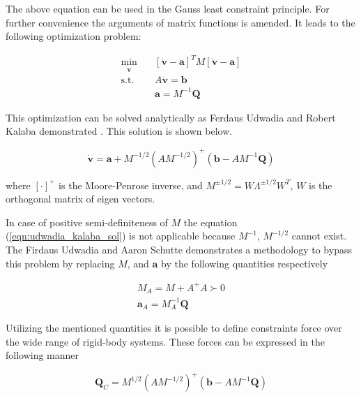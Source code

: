 The above equation can be used in the Gauss least constraint principle. For further 
convenience the arguments of matrix functions is amended. It leads to the 
following optimization problem:

\begin{equation}
    \begin{aligned}
        \min_{\dot{\mathbf{v}}} \quad &
        [\dot{\mathbf{v}} - \mathbf{a}]^T M [\dot{\mathbf{v}} - \mathbf{a}] \\
        \textrm{s.t.} \quad &
        A \dot{\mathbf{v}} = \mathbf{b} \\
        &
        \mathbf{a} = M^{-1} \mathbf{Q}
    \end{aligned}
    \label{eqn:gauss_least_const}
\end{equation}

This optimization can be solved analytically as Ferdaus Udwadia and Robert Kalaba 
demonstrated \cite{UdwadiaKalabaApproach}. This solution is shown below.

\begin{equation}
    \dot{\mathbf{v}} = 
    \mathbf{a} + M^{-1 / 2}(A M^{-1 / 2})^+ (\mathbf{b} - AM^{-1} \mathbf{Q})
    \label{eqn:udwadia_kalaba_sol}
\end{equation}

where $[\cdot]^+$ is the Moore-Penrose inverse, and 
$M^{\pm 1 / 2} = W \Lambda^{\pm 1 / 2} W^T$, $W$ is the orthogonal matrix 
of eigen vectors. 

In case of positive semi-definiteness of $M$ the equation 
(\ref{eqn:udwadia_kalaba_sol}) is not applicable because $M^{-1}$, 
$M^{-1 / 2}$ cannot exist. The Firdaus Udwadia and Aaron Schutte demonstrates 
\cite{EquationsOfMotionConst} a methodology to bypass this problem by 
replacing $M$, and $\mathbf{a}$ by the following quantities respectively

\begin{equation}
    \begin{aligned}
        M_A = M + A^+ A \succ 0 \\
        \mathbf{a}_A = M_A^{-1} \mathbf{Q}
    \end{aligned}
    \label{eqn:another_mass_matrix}
\end{equation}

Utilizing the mentioned quantities it is possible to define constraints 
force over the wide range of rigid-body systems. These forces can be 
expressed in the following manner 

\begin{equation}
    \mathbf{Q}_C = M^{1 / 2} (A M^{-1 /2})^+(\mathbf{b} - AM^{-1} \mathbf{Q})
    \label{eqn:constraint_forces}
\end{equation}

